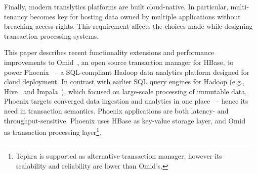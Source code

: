Finally, modern translytics platforms are built cloud-native. In particular, multi-tenancy becomes key 
for hosting data owned by multiple applications without breaching access rights. This requirement 
affects the choices made while designing transaction processing systems. 

This paper describes recent functionality extensions and performance improvements 
to Omid~\cite{omid}, an open source transaction manager for HBase, to power 
Phoenix~\cite{phoenix} -- a SQL-compliant Hadoop data analytics platform designed 
for cloud deployment. In contrast with earlier SQL query engines for Hadoop (e.g., 
Hive~\cite{hive} and Impala~\cite{impala}), which focused on large-scale processing
of immutable data, Phoenix targets converged data ingestion and analytics in one 
place~\cite{PhoenixUseCases} -- hence its need in transaction semantics. Phoenix
applications are both latency- and throughput-sensitive. Phoenix uses HBase 
as key-value storage layer, and Omid as transaction processing layer\footnote{
\small{Tephra is supported as alternative transaction manager, however its scalability 
and reliability are lower than Omid's.}}. 


